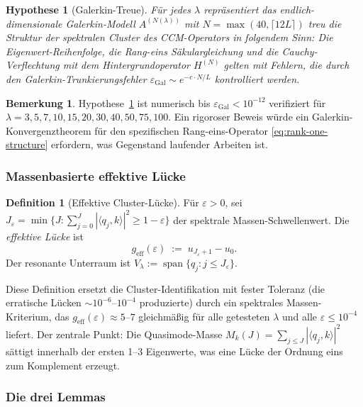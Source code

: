 \documentclass[11pt,a4paper]{article}
\theoremstyle{plain}
\newtheorem{hypothesis}[theorem]{Hypothese}
\theoremstyle{definition}
\newtheorem{definition}[theorem]{Definition}
\newtheorem{remark}[theorem]{Bemerkung}
\begin{document}
\begin{hypothesis}[Galerkin-Treue]
\label{hyp:galerkin}
Für jedes $\lambda$ repräsentiert das endlich-dimensionale Galerkin-Modell
$A^{(N(\lambda))}$ mit $N = \max(40, \lceil 12L \rceil)$ treu die Struktur der
spektralen Cluster des CCM-Operators in folgendem Sinn: Die Eigenwert-Reihenfolge,
die Rang-eins Säkulargleichung und die Cauchy-Verflechtung mit dem Hintergrundoperator
$H^{(N)}$ gelten mit Fehlern, die durch den Galerkin-Trunkierungsfehler
$\varepsilon_{\mathrm{Gal}} \sim e^{-c \cdot N/L}$ kontrolliert werden.
\end{hypothesis}

\begin{remark}
Hypothese~\ref{hyp:galerkin} ist numerisch bis $\varepsilon_{\mathrm{Gal}} < 10^{-12}$
verifiziert für $\lambda = 3, 5, 7, 10, 15, 20, 30, 40, 50, 75, 100$. Ein rigoroser
Beweis würde ein Galerkin-Konvergenztheorem für den spezifischen Rang-eins-Operator
\eqref{eq:rank-one-structure} erfordern, was Gegenstand laufender Arbeiten ist.
\end{remark}

\subsubsection{Massenbasierte effektive Lücke}

\begin{definition}[Effektive Cluster-Lücke]\label{def:geff}
Für $\varepsilon > 0$, sei $J_\varepsilon = \min\{J :
\sum_{j=0}^{J} |\langle q_j, k\rangle|^2 \geq 1 - \varepsilon\}$
der spektrale Massen-Schwellenwert. Die \emph{effektive Lücke} ist
\[
  g_{\mathrm{eff}}(\varepsilon) \;:=\; u_{J_\varepsilon + 1} - u_0.
\]
Der resonante Unterraum ist $V_\lambda := \operatorname{span}\{q_j : j \leq J_\varepsilon\}$.
\end{definition}

Diese Definition ersetzt die Cluster-Identifikation mit fester Toleranz
(die erratische Lücken $\sim 10^{-6}$--$10^{-4}$ produzierte) durch ein
spektrales Massen-Kriterium, das $g_{\mathrm{eff}}(\varepsilon) \approx 5$--$7$
gleichmäßig für alle getesteten $\lambda$ und alle $\varepsilon \leq 10^{-4}$ liefert.
Der zentrale Punkt: Die Quasimode-Masse $M_k(J) = \sum_{j \leq J} |\langle q_j, k\rangle|^2$
sättigt innerhalb der ersten 1--3 Eigenwerte, was eine Lücke der Ordnung eins zum Komplement erzeugt.

\subsubsection{Die drei Lemmas}
\end{document}
